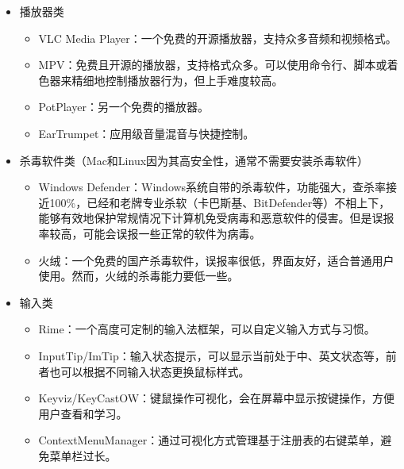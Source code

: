 \begin{itemize}
\begin{itemize}
    \end{itemize}
  \item 播放器类
    \begin{itemize}
      \item VLC Media Player：一个免费的开源播放器，支持众多音频和视频格式。
      \item MPV：免费且开源的播放器，支持格式众多。可以使用命令行、脚本或着色器来精细地控制播放器行为，但上手难度较高。
      \item PotPlayer：另一个免费的播放器。
      \item EarTrumpet：应用级音量混音与快捷控制。
    \end{itemize}
  \item 杀毒软件类（Mac和Linux因为其高安全性，通常不需要安装杀毒软件）
    \begin{itemize}
      \item Windows Defender：Windows系统自带的杀毒软件，功能强大，查杀率接近100\%，已经和老牌专业杀软（卡巴斯基、BitDefender等）不相上下，能够有效地保护常规情况下计算机免受病毒和恶意软件的侵害。但是误报率较高，可能会误报一些正常的软件为病毒。
      \item 火绒：一个免费的国产杀毒软件，误报率很低，界面友好，适合普通用户使用。然而，火绒的杀毒能力要低一些。
    \end{itemize}
  \item 输入类
    \begin{itemize}
      \item Rime：一个高度可定制的输入法框架，可以自定义输入方式与习惯。
      \item InputTip/ImTip：输入状态提示，可以显示当前处于中、英文状态等，前者也可以根据不同输入状态更换鼠标样式。
      \item Keyviz/KeyCastOW：键鼠操作可视化，会在屏幕中显示按键操作，方便用户查看和学习。
      \item ContextMenuManager：通过可视化方式管理基于注册表的右键菜单，避免菜单栏过长。


\end{itemize}
\end{itemize}

